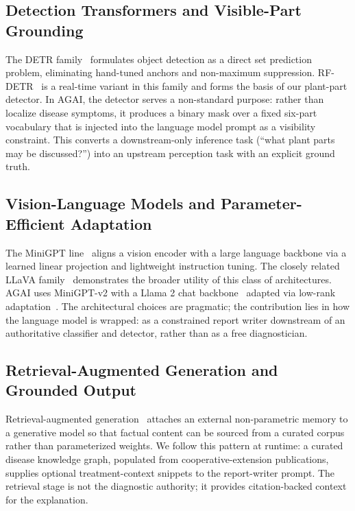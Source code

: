 \subsection{Detection Transformers and Visible-Part Grounding}

The DETR family~\citep{carion2020detr} formulates object detection as a
direct set prediction problem, eliminating hand-tuned anchors and
non-maximum suppression. RF-DETR~\citep{robinson2025rfdetr} is a
real-time variant in this family and forms the basis of our plant-part
detector. In AGAI, the detector serves a non-standard purpose: rather
than localize disease symptoms, it produces a binary mask over a fixed
six-part vocabulary that is injected into the language model prompt as a
visibility constraint. This converts a downstream-only inference task
(``what plant parts may be discussed?'') into an upstream perception
task with an explicit ground truth.

\subsection{Vision-Language Models and Parameter-Efficient Adaptation}

The MiniGPT line~\citep{zhu2023minigpt4,chen2023minigptv2} aligns a
vision encoder with a large language backbone via a learned linear
projection and lightweight instruction tuning. The closely related LLaVA
family~\citep{liu2023llava} demonstrates the broader utility of this
class of architectures. AGAI uses MiniGPT-v2 with a Llama 2 chat
backbone~\citep{touvron2023llama2} adapted via low-rank
adaptation~\citep{hu2021lora}. The architectural choices are pragmatic;
the contribution lies in how the language model is wrapped: as a
constrained report writer downstream of an authoritative classifier and
detector, rather than as a free diagnostician.

\subsection{Retrieval-Augmented Generation and Grounded Output}

Retrieval-augmented generation~\citep{lewis2020rag} attaches an external
non-parametric memory to a generative model so that factual content can
be sourced from a curated corpus rather than parameterized weights. We
follow this pattern at runtime: a curated disease knowledge graph,
populated from cooperative-extension publications, supplies optional
treatment-context snippets to the report-writer prompt. The retrieval
stage is not the diagnostic authority; it provides citation-backed
context for the explanation.

